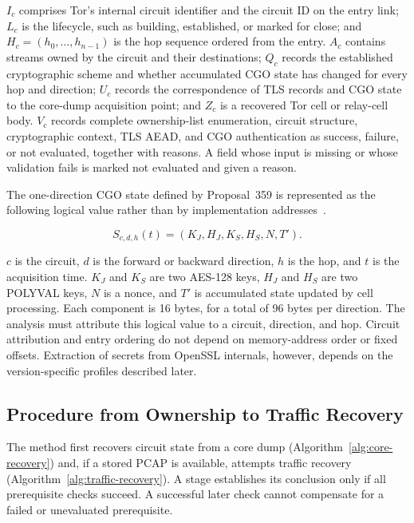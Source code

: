 \documentclass[10pt,a4paper]{article}
\begin{document}
$I_c$ comprises Tor's internal circuit identifier and the circuit ID on the entry link; $L_c$ is the lifecycle, such as building, established, or marked for close; and $H_c=(h_0,\ldots,h_{n-1})$ is the hop sequence ordered from the entry. $A_c$ contains streams owned by the circuit and their destinations; $Q_c$ records the established cryptographic scheme and whether accumulated CGO state has changed for every hop and direction; $U_c$ records the correspondence of TLS records and CGO state to the core-dump acquisition point; and $Z_c$ is a recovered Tor cell or relay-cell body. $V_c$ records complete ownership-list enumeration, circuit structure, cryptographic context, TLS AEAD, and CGO authentication as success, failure, or not evaluated, together with reasons. A field whose input is missing or whose validation fails is marked not evaluated and given a reason.

The one-direction CGO state defined by Proposal~359 is represented as the following logical value rather than by implementation addresses~\cite{torproposal359}.

\begin{equation}
S_{c,d,h}(t)=(K_J,H_J,K_S,H_S,N,T').
\label{eq:cgo-state}
\end{equation}

$c$ is the circuit, $d$ is the forward or backward direction, $h$ is the hop, and $t$ is the acquisition time. $K_J$ and $K_S$ are two AES-128 keys, $H_J$ and $H_S$ are two POLYVAL keys, $N$ is a nonce, and $T'$ is accumulated state updated by cell processing. Each component is 16 bytes, for a total of 96 bytes per direction. The analysis must attribute this logical value to a circuit, direction, and hop. Circuit attribution and entry ordering do not depend on memory-address order or fixed offsets. Extraction of secrets from OpenSSL internals, however, depends on the version-specific profiles described later.

\subsection{Procedure from Ownership to Traffic Recovery}

The method first recovers circuit state from a core dump (Algorithm~\ref{alg:core-recovery}) and, if a stored PCAP is available, attempts traffic recovery (Algorithm~\ref{alg:traffic-recovery}). A stage establishes its conclusion only if all prerequisite checks succeed. A successful later check cannot compensate for a failed or unevaluated prerequisite.
\end{document}
